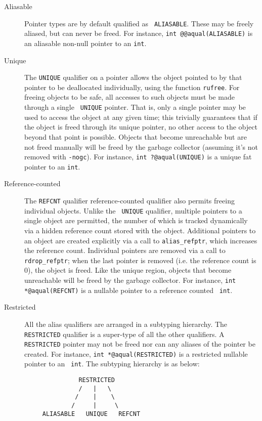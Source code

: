 \begin{description}
\item[Aliasable] Pointer types are by default qualified as {\tt
  ALIASABLE}. These may be freely aliased, but can never be freed. For
  instance, {\tt int @@aqual(ALIASABLE)} is an aliasable non-null
  pointer to an {\tt int}.

\item[Unique] The {\tt UNIQUE} qualifier on a pointer allows the
  object pointed to by that pointer to be deallocated individually,
  using the function \texttt{rufree}. For freeing objects to be safe,
  all accesses to such objects must be made through a single {\tt
  UNIQUE} pointer. That is, only a single pointer may be used to
  access the object at any given time; this trivially guarantees that
  if the object is freed through its unique pointer, no other access
  to the object beyond that point is possible.  Objects that become
  unreachable but are not freed manually will be freed by the garbage
  collector (assuming it's not removed with \texttt{-nogc}). For
  instance, {\tt int ?@aqual(UNIQUE)} is a unique fat pointer to an
  {\tt int}.

\item[Reference-counted] The {\tt REFCNT} qualifier reference-counted
  qualifier also permits freeing individual objects.  Unlike the {\tt
  UNIQUE} qualifier, multiple pointers to a single object are
  permitted, the number of which is tracked dynamically via a hidden
  reference count stored with the object.  Additional pointers to an
  object are created explicitly via a call to \texttt{alias\_refptr},
  which increases the reference count.  Individual pointers are
  removed via a call to \texttt{rdrop\_refptr}; when the last pointer
  is removed (i.e. the reference count is 0), the object is freed.
  Like the unique region, objects that become unreachable will be
  freed by the garbage collector. For instance, {\tt int
  *@aqual(REFCNT)} is a nullable pointer to a reference counted {\tt
  int}.

\item[Restricted] All the alias qualifiers are arranged in a subtyping
  hierarchy. The {\tt RESTRICTED} qualifier is a super-type of all the
  other qualifiers. A {\tt RESTRICTED} pointer may not be freed nor
  can any aliases of the pointer be created. For instance, {\tt int
  *@aqual(RESTRICTED)} is a restricted nullable pointer to an {\tt
  int}. The subtyping hierarchy is as below:

\begin{verbatim}
               RESTRICTED
               /   |   \
              /    |    \
             /     |     \
     ALIASABLE   UNIQUE   REFCNT
\end{verbatim}
  
\end{description}

